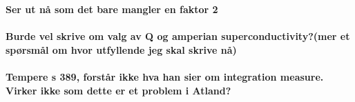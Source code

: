 \documentclass{article}
\begin{document}
\textbf{Ser ut nå som det bare mangler en faktor 2}
\\
\\
\textbf{Burde vel skrive om valg av Q og amperian superconductivity?(mer et spørsmål om hvor utfyllende jeg skal skrive nå)}
\\
\\
\textbf{Tempere s 389, forstår ikke hva han sier om integration measure. Virker ikke som dette er et problem i Atland?}
\printbibliography
\end{document}
